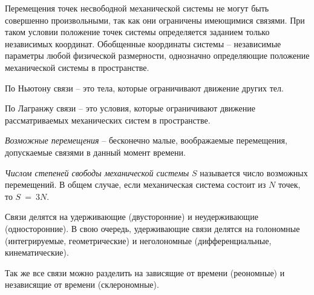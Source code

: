 
Перемещения точек несвободной механической системы не могут быть совершенно
произвольными, так как они ограничены имеющимися связями. При таком условии
положение точек системы определяется заданием только независимых координат.
Обобщенные координаты системы -- независимые параметры любой физической
размерности, однозначно определяющие положение механической системы в
пространстве.


По Ньютону связи -- это тела, которые ограничивают движение других тел.

По Лагранжу связи -- это условия, которые ограничивают движение рассматриваемых
механических систем в пространстве.

\emph{Возможные перемещения} -- бесконечно малые, воображаемые перемещения,
допускаемые связями в данный момент времени.

\emph{Числом степеней свободы механической системы} \( S \) называется число
возможных перемещений. В общем случае, если механическая система состоит из
\( N \) точек, то \( S~=~3N \).

Связи делятся на удерживающие (двусторонние) и неудерживающие (односторонние).
В свою очередь, удерживающие связи делятся на голономные (интегрируемые,
геометрические) и неголономные (дифференциальные, кинематические).

Так же все связи можно разделить на зависящие от времени (реономные) и
независящие от времени (склерономные).

\newpage
